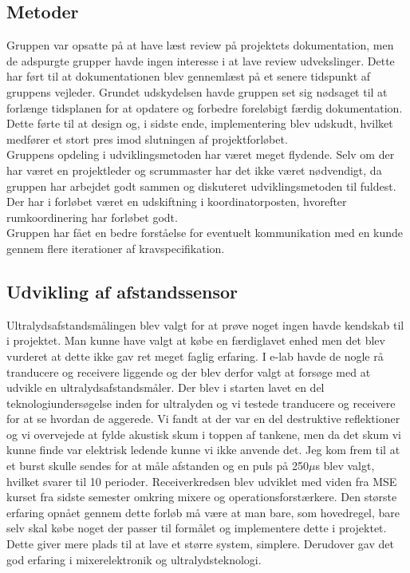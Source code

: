 \subsection{Metoder}
Gruppen var opsatte på at have læst review på projektets dokumentation, men de adspurgte grupper havde ingen interesse i at lave review udvekslinger. Dette har ført til at dokumentationen blev gennemlæst på et senere tidspunkt af gruppens vejleder. Grundet udskydelsen havde gruppen set sig nødsaget til at forlænge tidsplanen for at opdatere og forbedre foreløbigt færdig dokumentation. Dette førte til at design og, i sidste ende, implementering blev udskudt, hvilket medfører et stort pres imod slutningen af projektforløbet.\\
Gruppens opdeling i udviklingsmetoden har været meget flydende. Selv om der har været en projektleder og scrummaster har det ikke været nødvendigt, da gruppen har arbejdet godt sammen og diskuteret udviklingsmetoden til fuldest. Der har i forløbet været en udskiftning i koordinatorposten, hvorefter rumkoordinering har forløbet godt.\\
Gruppen har fået en bedre forståelse for eventuelt kommunikation med en kunde gennem flere iterationer af kravspecifikation.

\subsection{Udvikling af afstandssensor}
Ultralydsafstandsmålingen blev valgt for at prøve noget ingen havde kendskab til i projektet. Man kunne have valgt at købe en færdiglavet enhed men det blev vurderet at dette ikke gav ret meget faglig erfaring. I e-lab havde de nogle rå tranducere og receivere liggende og der blev derfor valgt at forsøge med at udvikle en ultralydsafstandsmåler. Der blev i starten lavet en del teknologiundersøgelse inden for ultralyden og vi testede tranducere og receivere for at se hvordan de aggerede. Vi fandt at der var en del destruktive reflektioner og vi overvejede at fylde akustisk skum i toppen af tankene, men da det skum vi kunne finde var elektrisk ledende kunne vi ikke anvende det. Jeg kom frem til at et burst skulle sendes for at måle afstanden og en puls på 250$\mu$s blev valgt, hvilket svarer til 10 perioder. Receiverkredsen blev udviklet med viden fra MSE kurset fra sidste semester omkring mixere og operationsforstærkere. Den største erfaring opnået gennem dette forløb må være at man bare, som hovedregel, bare selv skal købe noget der passer til formålet og implementere dette i projektet. Dette giver mere plads til at lave et større system, simplere. Derudover gav det god erfaring i mixerelektronik og ultralydsteknologi.